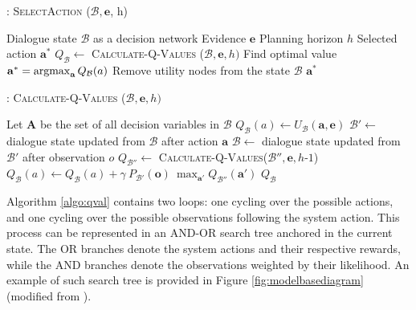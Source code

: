 \begin{algorithm}[h!]
\caption{: \textsc{SelectAction} ($\mathcal{B}, \mathbf{e}$, h)}
\begin{algorithmic}[1] \vspace{1mm}
\REQUIRE Dialogue state $\mathcal{B}$ as a decision network
\REQUIRE Evidence $\mathbf{e}$
\REQUIRE Planning horizon $h$
\ENSURE Selected action $\mathbf{a}^*$
\STATE $Q_{\mathcal{B}} \leftarrow $ \textsc{Calculate-Q-Values} ($\mathcal{B}, \mathbf{e}, h)$
\STATE Find optimal value $\mathbf{a}^* = \argmax_{\mathbf{a}} Q_{\mathcal{B}}(a)$
\STATE Remove utility nodes from the state $\mathcal{B}$
\RETURN $\mathbf{a}^*$
\end{algorithmic}
\label{algo:planning}
\end{algorithm}


\begin{algorithm}[h!]
\caption{: \textsc{Calculate-Q-Values} ($\mathcal{B}, \mathbf{e}, h)$}
\begin{algorithmic}[1] \vspace{1mm}
\STATE Let $\mathbf{A}$ be the set of all decision variables in $\mathcal{B}$
\STATE $Q_{\mathcal{B}}(a) \leftarrow U_{\mathcal{B}}(\mathbf{a}, \mathbf{e})$
\STATE $\mathcal{B}' \leftarrow $ dialogue state updated from $\mathcal{B}$ after action $\mathbf{a}$
\STATE $\mathcal{B} \leftarrow $ dialogue state updated from $\mathcal{B}'$ after observation $o$
\STATE $Q_{\mathcal{B}''} \leftarrow $ \textsc{Calculate-Q-Values}($\mathcal{B}'', \mathbf{e}, h\mbox{-}1$)
\STATE $Q_{\mathcal{B}}(a) \leftarrow Q_{\mathcal{B}}(a) + \gamma \ P_{\mathcal{B}'}(\mathbf{o}) \ \max_{\mathbf{a}'} Q_{\mathcal{B}''}(\mathbf{a}')$
\ENDFOR
\ENDIF
\ENDFOR
\RETURN $Q_{\mathcal{B}}$
\end{algorithmic} 
\label{algo:qval}
\end{algorithm}

Algorithm \ref{algo:qval} contains two loops: one cycling over the possible actions, and one cycling over the possible observations following the system action. This process can be represented in an AND-OR search tree anchored in the current state. The OR branches denote the system actions and their respective rewards, while the AND branches denote the observations weighted by their likelihood. An example of such search tree is provided in Figure \ref{fig:modelbasediagram} (modified from \cite{ross2008}).


